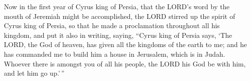  Now in the first year of Cyrus king of Persia, that the
LORD's word by the mouth of Jeremiah might be accomplished, the LORD
stirred up the spirit of Cyrus king of Persia, so that he made a
proclamation throughout all his kingdom, and put it also in writing,
saying,  ``Cyrus king of Persia says, `The LORD, the God
of heaven, has given all the kingdoms of the earth to me; and he has
commanded me to build him a house in Jerusalem, which is in Judah.
Whoever there is amongst you of all his people, the LORD his God be with
him, and let him go up.'\,''
